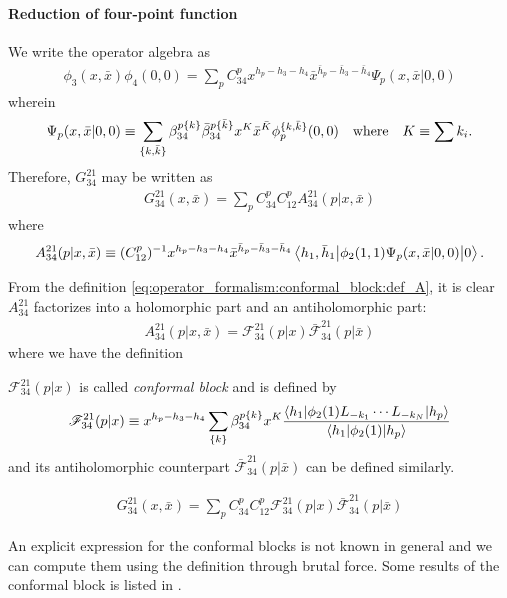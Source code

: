 \documentclass[10pt]{article}
\newenvironment{boxmath}[1]{\begin{tcolorbox}[enhanced,attach boxed title to top center={yshift=-\tcboxedtitleheight/2},boxrule=1pt,title={\centering #1},colframe=NavyBlue!70!black,colback=NavyBlue!10,colbacktitle=NavyBlue!10,fonttitle=\scshape,coltitle=Black]}{\end{tcolorbox}}
\begin{document}
\paragraph{Reduction of four-point function}
We write the operator algebra as
\begin{align}
    \phi_3(x,\bar{x})\phi_4(0,0)=\sum_p C^{p}_{34}x^{h_p-h_3-h_4}\bar{x}^{\bar{h}_p-\bar{h}_3-\bar{h}_4}\Psi_p(x,\bar{x}|0,0)
\end{align}
wherein 
\begin{align}
    \Psi_p(x,\bar{x}|0,0)\equiv\sum_{\{k,\bar{k}\}}\beta^{p\{k\}}_{34}\bar{\beta}^{p\{\bar{k}\}}_{34}x^K \bar{x}^{\bar{K}}\phi_p^{\{k,\bar{k}\}}(0,0)\qq{where} K\equiv\sum k_i.
\end{align}
Therefore, $G^{21}_{34}$ may be written as 
\begin{align}
    G^{21}_{34}(x,\bar{x})=\sum_p C^p_{34} C^p_{12} A^{21}_{34}(p|x,\bar{x})
\end{align}
where 
\begin{align}\label{eq:operator_formalism:conformal_block:def_A}
    A^{21}_{34}(p|x,\bar{x})\equiv(C^p_{12})^{-1}x^{h_p-h_3-h_4}\bar{x}^{\bar{h}_p-\bar{h}_3-\bar{h}_4}\mel**{h_1,\bar{h}_1}{\phi_2(1,1)\Psi_p(x,\bar{x}|0,0)}{0}.
\end{align}

From the definition \cref{eq:operator_formalism:conformal_block:def_A}, it is clear $A^{21}_{34}$ factorizes into a holomorphic part and an antiholomorphic part:
\begin{align}
    A^{21}_{34}(p|x,\bar{x})=\mathscr{F}^{21}_{34}(p|x)\bar{\mathscr{F}}^{21}_{34}(p|\bar{x})
\end{align}
where we have the definition  
\begin{definition}
    $\mathscr{F}^{21}_{34}(p|x)$ is called \textit{conformal block} and is defined by
    \begin{align}
        \mathscr{F}^{21}_{34}(p|x)\equiv x^{h_p-h_3-h_4}\sum_{\{k\}}\beta^{p\{k\}}_{34}x^K\frac{\mel**{h_1}{\phi_2(1)L_{-k_1}\cdots L_{-k_N}}{h_p}}{\mel**{h_1}{\phi_2(1)}{h_p}}
    \end{align}
    and its antiholomorphic counterpart $\bar{\mathscr{F}}^{21}_{34}(p|\bar{x})$ can be defined similarly.
\end{definition}
\begin{boxmath}{Four-point Function}
    \begin{align}
        G^{21}_{34}(x,\bar{x})=\sum_p C^p_{34} C^p_{12}\mathscr{F}^{21}_{34}(p|x)\bar{\mathscr{F}}^{21}_{34}(p|\bar{x})
    \end{align}
\end{boxmath}
\begin{remark}
    An explicit expression for the conformal blocks is not known in general and we can compute them using the definition through brutal force.
    Some results of the conformal block is listed in \cite{DiFrancesco:1997nk}.
\end{remark}
\end{document}
